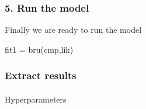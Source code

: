 \documentclass[
  letterpaper,
  DIV=11,
  numbers=noendperiod]{scrartcl}
\makeatletter
\let\oldparagraph\paragraph
\renewcommand{\paragraph}{
    \@ifstar
      \xxxParagraphStar
      \xxxParagraphNoStar
  }
\newcommand{\xxxParagraphStar}[1]{\oldparagraph*{#1}\mbox{}}
\newcommand{\xxxParagraphNoStar}[1]{\oldparagraph{#1}\mbox{}}
\newenvironment{Shaded}{\begin{snugshade}}{\end{snugshade}}
\newcommand{\FunctionTok}[1]{\textcolor[rgb]{0.28,0.35,0.67}{#1}}
\newcommand{\NormalTok}[1]{\textcolor[rgb]{0.00,0.23,0.31}{#1}}
\newcommand{\OtherTok}[1]{\textcolor[rgb]{0.00,0.23,0.31}{#1}}
\makeatother
\begin{document}
\subsubsection{5. Run the model}\label{run-the-model}

Finally we are ready to run the model

\begin{Shaded}
\begin{Highlighting}[]
\NormalTok{fit1 }\OtherTok{=} \FunctionTok{bru}\NormalTok{(cmp,lik)}
\end{Highlighting}
\end{Shaded}

\subsubsection{Extract results}\label{extract-results}

\paragraph{Hyperparameters}\label{hyperparameters}
\end{document}
